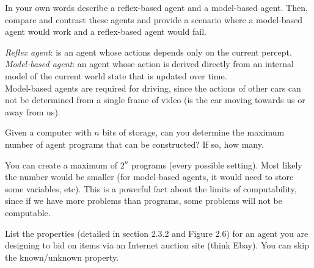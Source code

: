 \documentclass[11pt,letterpaper,addpoints]{exam}
\begin{document}
\begin{questions}

\pagebreak

\question In your own words describe a reflex-based agent and a model-based agent.  Then, compare and
contrast these agents and provide a scenario where a model-based agent would work and 
a reflex-based agent would fail.
\begin{solutionorbox}[1.0 in]
{\it Reflex agent}: is an agent whose actions depends only on the current percept. \\
{\it Model-based agent}: an agent whose action is derived directly from an internal 
model of the current world state that is updated over time. \\
Model-based agents are required for driving, since the actions of other cars can not be determined
from a single frame of video (is the car moving towards us or away from us).  
\end{solutionorbox}

\question Given a computer with $n$ bits of storage, can you determine the maximum number of
agent programs that can be constructed?  If so, how many.  
\begin{solutionorbox}[1.0 in]
You can create a maximum of $2^{n}$ programs (every possible setting).  Most likely the number
would be smaller (for model-based agents, it would need to store some variables, etc).  This
is a powerful fact about the limits of computability, since if we have more problems than programs, 
some problems will not be computable.  
\end{solutionorbox}



\question List the properties (detailed in section 2.3.2 and Figure 2.6) for an agent you are designing
to bid on items via an Internet auction site (think Ebay).  You can skip the known/unknown property.
\begin{solutionorbox}[4.0 in]


\end{solutionorbox}
\end{questions}
\end{document}
